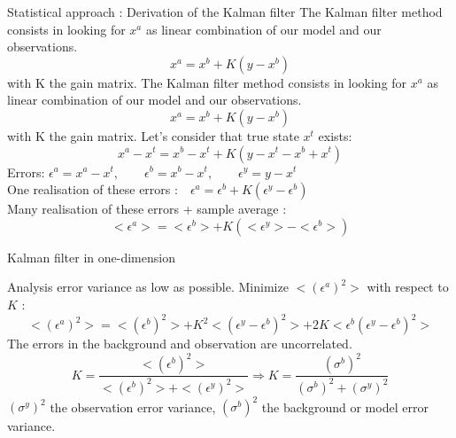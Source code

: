    \begin{frame}[allowframebreaks]{Statistical approach : Derivation of the Kalman filter}
       The Kalman filter method consists in looking for $x^a$ as linear combination of our model and our observations.
       \begin{equation*}
           x^a=x^b+K(y-x^b)
           \label{eq1}
       \end{equation*}
       with K the gain matrix.
    \newpage
        The Kalman filter method consists in looking for $x^a$ as linear combination of our model and our observations.
       \begin{equation}
           x^a=x^b+K(y-x^b)
           \label{eq1}
       \end{equation}
       with K the gain matrix.
       \newline Let’s consider that true state $x^t$ exists:
       \begin{equation}
           x^a-x^t=x^b-x^t+K(y-x^t-x^b+x^t)
       \end{equation}
       Errors: \qquad $\epsilon^a=x^a-x^t,\qquad \epsilon^b=x^b-x^t, \qquad \epsilon^y=y-x^t$ \\
       One realisation of these errors :$ \quad \epsilon^a=\epsilon^b+K(\epsilon^y-\epsilon^b)$ \\
       Many realisation of these errors + sample average :
       \begin{equation}
           <\epsilon^a>=<\epsilon^b>+K(<\epsilon^y>-<\epsilon^b>)
       \end{equation}
    \end{frame}
    \begin{frame}{Kalman filter in one-dimension}

       Analysis error variance as low as possible.
       \newline Minimize $<(\epsilon^a)^2>$ with respect to $K$ :
       $$<(\epsilon^a)^2>=<(\epsilon^b)^2>+K^2<(\epsilon^y-\epsilon^b)^2>+2K<\epsilon^b(\epsilon^y-\epsilon^b)^2>$$
       The errors in the background and observation are uncorrelated.
       $$K=\frac{<(\epsilon^b)^2>}{<(\epsilon^b)^2>+<(\epsilon^y)^2>} \Rightarrow K=\frac{(\sigma^b)^2}{(\sigma^b)^2+(\sigma^y)^2} $$
       $(\sigma^y)^2$ the observation error variance, \newline $(\sigma^b)^2$ the background or model error variance.
   
	\end{frame}
       

